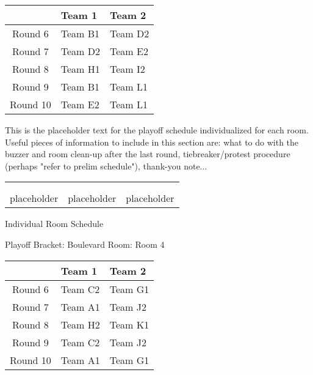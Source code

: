 \documentclass{article}%
\begin{document}
%
\begin{tabularx}{\textwidth}{|c|Y|Y|}%
\hline%
&Team 1&Team 2\\%
\hline%
Round 6&Team B1&Team D2\\%
Round 7&Team D2&Team E2\\%
Round 8&Team H1&Team I2\\%
Round 9&Team B1&Team L1\\%
Round 10&Team E2&Team L1\\%
\hline%
\end{tabularx}%
\vspace*{16pt}%
\linebreak%
This is the placeholder text for the playoff schedule individualized for each room. Useful pieces of information to include in this section are: what to do with the buzzer and room clean{-}up after the last round, tiebreaker/protest procedure (perhaps "refer to prelim schedule"), thank{-}you note...%
\vspace*{30pt}%
\newline%
%
\begin{tabularx}{\textwidth}{YYY}%
  &  &  \\%
\\%
placeholder&placeholder&placeholder\\%
\end{tabularx}%
\newpage%
\begin{center}%
\begin{Huge}%
Individual Room Schedule%
\end{Huge}%
\vspace*{16pt}%
\linebreak%
\begin{Large}%
Playoff Bracket: Boulevard \hfill Room: Room 4%
\end{Large}%
\end{center}%
%
\begin{tabularx}{\textwidth}{|c|Y|Y|}%
\hline%
&Team 1&Team 2\\%
\hline%
Round 6&Team C2&Team G1\\%
Round 7&Team A1&Team J2\\%
Round 8&Team H2&Team K1\\%
Round 9&Team C2&Team J2\\%
Round 10&Team A1&Team G1\\%
\hline%
\end{tabularx}%
\end{document}
